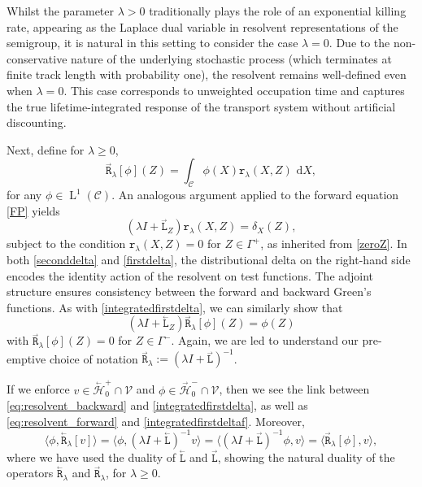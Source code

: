 \documentclass{amsart}
\newcommand{\dd}{{\mathrm d}}
\newcommand{\fL}{\stackrel{_\rightarrow}{\mathtt L}}
\newcommand{\bL}{\stackrel{_\leftarrow}{\mathtt L}}
\newcommand{\fR}{\stackrel{_\rightarrow}{\mathtt R}}
\newcommand{\bR}{\stackrel{_\leftarrow}{\mathtt R}}
\newcommand{\rr}{{\mathtt r}}
\theoremstyle{plain}
\newcommand{\leb}{\text{Leb}}
\newcommand{\LL}{\ensuremath{\operatorname L}\xspace}
\renewcommand{\leb}[1]{\ensuremath{\LL^{#1}}}
\newcommand{\cH}{\stackrel{_\rightarrow}{\mathscr H}}
\newcommand{\cbH}{\stackrel{_\leftarrow}{\mathscr H}}
\newcommand{\cV}{\ensuremath{\mathscr V}}
\begin{document}
Whilst the parameter $\lambda > 0$ traditionally plays the role of an
exponential killing rate, appearing as the Laplace dual variable in
resolvent representations of the semigroup, it is natural in this
setting to consider the case $\lambda = 0$. Due to the
non-conservative nature of the underlying stochastic process (which
terminates at finite track length with probability one), the resolvent
remains well-defined even when $\lambda = 0$. This case corresponds to
unweighted occupation time and captures the true lifetime-integrated
response of the transport system without artificial discounting.

Next, define for $\lambda\geq0$,
\begin{equation}
    \fR_\lambda[\phi](Z) = \int_{\mathcal{C}}\phi(X) \rr_\lambda(X, Z) \,  \, \dd X,
    \label{forwardR}
\end{equation}
for any $\phi \in \leb{1}(\mathcal{C})$.
An analogous argument applied to the forward equation \eqref{FP}
yields
\begin{equation}
  (\lambda I + \fL_Z) \rr_\lambda(X, Z) = \delta_X(Z),
  \label{seconddelta}
\end{equation}
subject to the condition $\rr_\lambda(X, Z) = 0$ for $Z \in \Gamma^+$,
as inherited from \eqref{zeroZ}.  In both \eqref{seconddelta} and
\eqref{firstdelta}, the distributional delta on the right-hand side
encodes the identity action of the resolvent on test functions. The
adjoint structure ensures consistency between the forward and backward
Green's functions.  As with \eqref{integratedfirstdelta}, we can
similarly show that
\begin{equation}
(\lambda I + \bL_Z)  \fR_\lambda[\phi](Z)= \phi(Z)
\label{integratedfirstdeltaf}
\end{equation}
with $ \fR_\lambda[\phi](Z) = 0$ for $Z\in \Gamma^-$.  Again, we are
led to understand our pre-emptive choice of notation $\fR_\lambda :=
(\lambda I + \fL)^{-1}$.


If we enforce $v\in\cbH_0^+\cap\cV$ and $\phi\in\cH_0^-\cap\cV$, then
we see the link between \eqref{eq:resolvent_backward} and
\eqref{integratedfirstdelta}, as well as \eqref{eq:resolvent_forward}
and \eqref{integratedfirstdeltaf}. Moreover,
\begin{equation}
\langle\phi, \bR_\lambda[v]\rangle = \langle  \phi , (\lambda I + \bL)^{-1}  v\rangle = \langle (\lambda I + \fL)^{-1} \phi, v\rangle = \langle  \fR_\lambda[\phi] , v\rangle, 
\end{equation}
where we have used the duality of $\bL$ and $\fL$, showing the natural
duality of the operators $\bR_\lambda$ and $\fR_\lambda$, for
$\lambda\geq0$.
\end{document}
